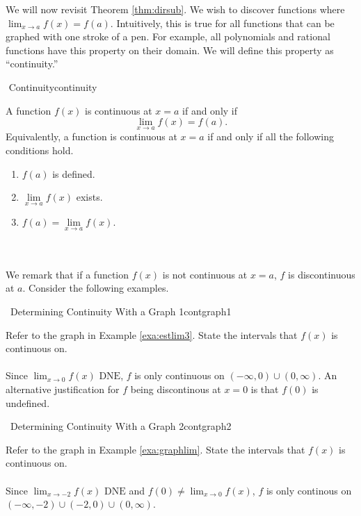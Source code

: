         We will now revisit Theorem \ref{thm:dirsub}. We wish to discover functions where \(\lim_{x\to a}f(x)=f(a)\). Intuitively, this is true for all functions that can be graphed with one stroke of a pen. For example, all polynomials and rational functions have this property on their domain. We will define this property as ``continuity.''
        \begin{definition}{\Stop\,\,Continuity}{continuity}

            A function \(f(x)\) is continuous at \(x=a\) if and only if
            \begin{equation*}
                \lim_{x\to a}f(x)=f(a).
            \end{equation*}
            Equivalently, a function is continuous at \(x=a\) if and only if all the following conditions hold.
            \begin{enumerate}
                \item \(f(a)\) is defined.
                \item \(\lim\limits_{x\to a}f(x)\) exists.
                \item \(f(a)=\lim\limits_{x\to a}f(x)\).
            \end{enumerate}
            
        \end{definition}
        \vphantom
        \\
        \\
        We remark that if a function \(f(x)\) is not continuous at \(x=a\), \(f\) is discontinuous at \(a\). Consider the following examples.
        \begin{example}{\Difficulty\,\Difficulty\,\,Determining Continuity With a Graph 1}{contgraph1}

            Refer to the graph in Example \ref{exa:estlim3}. State the intervals that \(f(x)\) is continuous on.
            \\
            \\
            Since \(\lim_{x\to 0}f(x)\text{ DNE}\), \(f\) is only continuous on \((-\infty,0)\cup(0,\infty)\). An alternative justification for \(f\) being discontinous at \(x=0\) is that \(f(0)\) is undefined.

        \end{example}
        \begin{example}{\Difficulty\,\Difficulty\,\,Determining Continuity With a Graph 2}{contgraph2}

            Refer to the graph in Example \ref{exa:graphlim}. State the intervals that \(f(x)\) is continuous on.
            \\
            \\
            Since \(\lim_{x\to -2}f(x)\text{ DNE}\) and \(f(0)\neq\lim_{x\to 0}f(x)\), \(f\) is only continous on \((-\infty,-2)\cup(-2,0)\cup(0,\infty)\).
            
        \end{example}
